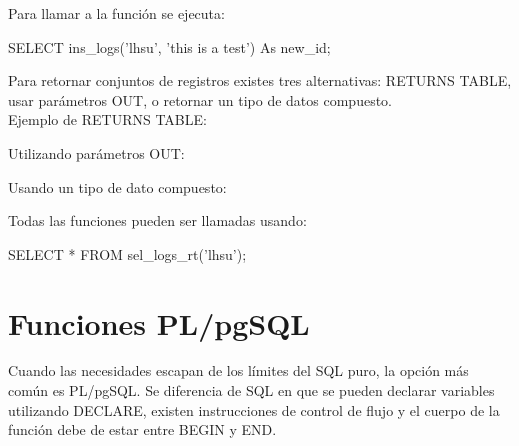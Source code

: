 Para llamar a la función se ejecuta:\\

\begin{pyglist}
SELECT ins_logs('lhsu', 'this is a test') As new_id;
\end{pyglist}

Para retornar conjuntos de registros existes tres alternativas: RETURNS TABLE, usar parámetros OUT, o retornar un tipo de datos compuesto. \cite{Obe2012}\\

Ejemplo de RETURNS TABLE:\\


Utilizando parámetros OUT:\\


Usando un tipo de dato compuesto:\\




Todas las funciones pueden ser llamadas usando:\\

\begin{pyglist}
SELECT * FROM sel_logs_rt('lhsu');
\end{pyglist}

\section{Funciones PL/pgSQL}

Cuando las necesidades escapan de los límites del SQL puro, la opción más común es PL/pgSQL. Se diferencia de SQL en que se pueden declarar variables utilizando DECLARE, existen instrucciones de control de flujo y el cuerpo de la función debe de estar entre BEGIN y END.\\

